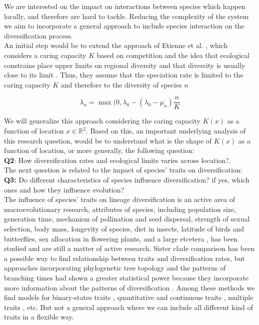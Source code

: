 We are interested on the impact on interactions between species which happen locally, and therefore are hard to tackle. Reducing the complexity of the system we aim to incorporate a general approach to include species interaction on the diversification process. \\

An initial step would be to extend the approach of Etienne et al. \cite{etienne2011diversity}, which considers a caring capacity $K$ based on competition and the idea that ecological constrains place upper limits on regional diversity and that diversity is usually close to its limit \cite{cornell2013regional}. Thus, they assume that the speciation rate is limited to the caring capacity $K$ and therefore to the diversity of species $n$ 

$$ \lambda_n = \max (0, \lambda_0 - (\lambda_0 - \mu_n)\frac{n}{K} $$

We will generalize this approach considering the caring capacity $K(x)$ as a function of location $x \in \mathbb{R}^2$. Based on this, an important underlying analysis of this research question, would be to understand what is the shape of $K(x)$ as a function of location, or more generally,  the following question:\\

{\bf Q2}: How diversification rates and ecological limits varies across location?. \\


The next question is related to the impact of species' traits on diversification:\\


{\bf Q3:} Do different characteristics of species influence diversification? if yes, which ones and how they influence evolution? \\



The influence of species' traits on lineage diversification is an active area of macroevolutionary research, attributes of species, including population size, generation time, mechanism of pollination and seed dispersal, strength of sexual selection, body mass, longevity of species, diet in insects, latitude of birds and butterflies, sex allocation in flowering plants, and a large etcetera \cite{barraclough1998revealing}, has been studied and are still a matter of active research.  Sister clade comparison \cite{magallon2001absolute} has been a possible way to find relationship between traits and diversification rates, but approaches incorporating phylogenetic tree topology and the patterns of branching times had shown a greater statistical power because they incorporate more information about the patterns of diversification \cite{paradis2005statistical}. Among these methods we find models for binary-states traits \cite{maddison2007estimating},  quantitative and continuous traits \cite{fitzjohn2010quantitative}, multiple traits \cite{fitzjohn2012diversitree}, etc. But not a general approach where we can include all different kind of traits in a flexible way.


